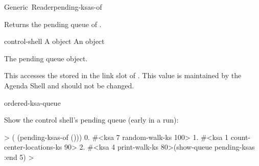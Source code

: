 \documentclass[10pt,twoside,english,pdftex]{article}
\begin{document}

\begin{functiondoc}{Generic~Reader}{pending-ksas-of}{ 
    }
%
%

\fnsyntax

\fnpurpose Returns the pending  queue of
.

\fnmethods
{}

\fnpackage {}

\fnmodule {}

\fnargs
\begin{args}{control-shell}
 A  object
 An \textbf{} object
\end{args}

\fnreturns The pending  queue object.

\fndescription 
%
This  accesses the
 stored in the
 link slot of . This value is maintained by
the Agenda Shell and should not be changed.

\begin{alsos}{ordered-ksa-queue}
\also[ksa]
\also[on-queue-p]
\end{alsos}

\fnexample
%
%
%
%
%
Show the control shell's pending  queue (early in a
 run):
%
\W\supp
\begin{example}
  >  ( (pending-ksas-of ()))
      0. #<ksa 7 random-walk-ks 100>
      1. #<ksa 1 count-center-locations-ks 90>
      2. #<ksa 4 print-walk-ks 80>(show-queue pending-ksas :end 5)
  >
\end{example}

\end{functiondoc}
\end{document}
